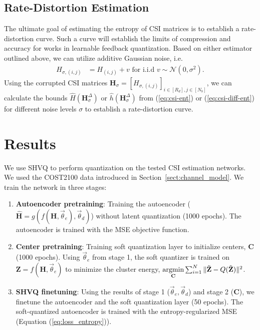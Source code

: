 \subsection{Rate-Distortion Estimation} \label{sec:rd_quant}

The ultimate goal of estimating the entropy of CSI matrices is to establish a rate-distortion curve. Such a curve will establish the limits of compression and accuracy for works in learnable feedback quantization. Based on either estimator outlined above, we can utilize additive Gaussian noise, i.e.
\begin{align*}
	H_{\sigma,(i,j)} &=  H_{(i,j)} + v \text{ for i.i.d } v \sim \mathcal{N}(0,\sigma^2).
\end{align*}
Using the corrupted CSI matrices $\mathbf H_{\sigma}=\left[ H_{\sigma,(i,j)}\right]_{i\in [R_d],j\in [N_b]}$, we can calculate the bounds $\hat H(\mathbf H_{\sigma}^\Delta)$ or $\hat h(\mathbf H_{\sigma}^\Delta)$ from (\ref{eq:csi-ent}) or (\ref{eq:csi-diff-ent}) for different noise levels $\sigma$ to establish a rate-distortion curve.

\section{Results}

We use SHVQ \cite{ref:Agustsson2017SoftToHard} to perform quantization on the tested CSI estimation networks. We used the COST2100 data introduced in Section~\ref{sect:channel_model}. We train the network in three stages:
\begin{enumerate}
	\item \textbf{Autoencoder pretraining}: Training the autoencoder ($\hat{\mathbf{H}}=g(f(\mathbf H, \vec\theta_e), \vec\theta_d)$) without latent quantization (1000 epochs). The autoencoder is trained with the MSE objective function.
	\item \textbf{Center pretraining}: Training soft quantization layer to initialize centers, $\mathbf C$ (1000 epochs). Using $\vec \theta_e$ from stage 1, the soft quantizer is trained on $\mathbf Z=f(\mathbf H, \vec \theta_e)$ to minimize the cluster energy, $\underset{\mathbf C}{\text{argmin}}\sum_{i=1}^N \Arrowvert \tilde{\mathbf Z} - Q(\tilde{\mathbf Z})\Arrowvert^2$.
	\item \textbf{SHVQ finetuning}: Using the results of stage 1 ($\vec\theta_e, \vec\theta_d$) and stage 2 ($\mathbf C$), we finetune the autoencoder and the soft quantization layer (50 epochs). The soft-quantized autoencoder is trained with the entropy-regularized MSE (Equation (\ref{eq:loss_entropy})).
\end{enumerate}


